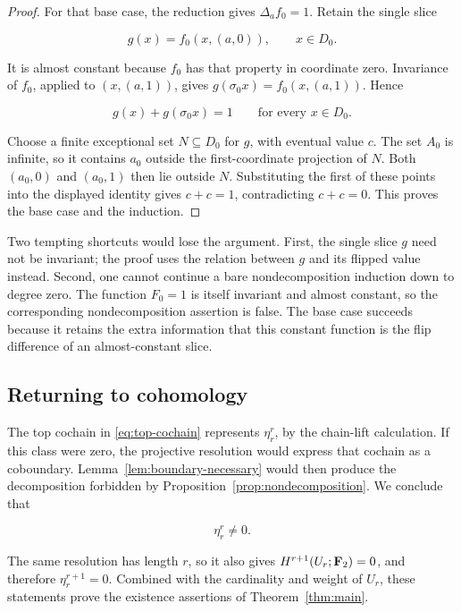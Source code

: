 \begin{proof}
For that base case, the reduction gives \(\Delta_a f_0=1\).  Retain the
single slice

\[
g(x)=f_0(x,(a,0)),
\qquad x\in D_0.
\]

It is almost constant because \(f_0\) has that property in coordinate
zero.  Invariance of \(f_0\), applied to \((x,(a,1))\), gives
\(g(\sigma_0x)=f_0(x,(a,1))\).  Hence

\[
g(x)+g(\sigma_0x)=1
\qquad\text{for every }x\in D_0.
\]

Choose a finite exceptional set \(N\subseteq D_0\) for \(g\), with
eventual value \(c\).  The set \(A_0\) is infinite, so it contains
\(a_0\) outside the first-coordinate projection of \(N\).  Both
\((a_0,0)\) and \((a_0,1)\) then lie outside \(N\).  Substituting the
first of these points into the displayed identity gives \(c+c=1\),
contradicting \(c+c=0\).  This proves the base case and the induction.
\end{proof}

\begin{remark}
Two tempting shortcuts would lose the argument.  First, the single slice
\(g\) need not be invariant; the proof uses the relation between \(g\)
and its flipped value instead.  Second, one cannot continue a bare
nondecomposition induction down to degree zero.  The function \(F_0=1\)
is itself invariant and almost constant, so the corresponding
nondecomposition assertion is false.  The base case succeeds because it
retains the extra information that this constant function is the flip
difference of an almost-constant slice.
\end{remark}

\subsection{Returning to cohomology}

The top cochain in \eqref{eq:top-cochain} represents \(\eta_r^r\), by the
chain-lift calculation.  If this class were zero, the projective
resolution would express that cochain as a coboundary.
Lemma~\ref{lem:boundary-necessary} would then produce the decomposition
forbidden by Proposition~\ref{prop:nondecomposition}.  We conclude that

\[
\eta_r^r\neq0.
\]

The same resolution has length \(r\), so it also gives
\(H^{r+1}(U_r;\mathbf F_2)=0\), and therefore \(\eta_r^{r+1}=0\).  Combined with
the cardinality and weight of \(U_r\), these statements prove the
existence assertions of Theorem~\ref{thm:main}.  
